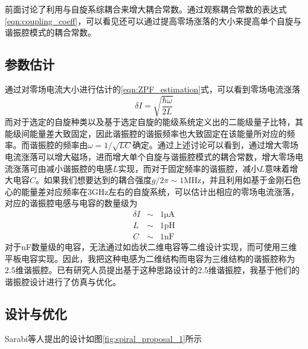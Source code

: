             前面讨论了利用与自旋系综耦合来增大耦合常数。通过观察耦合常数的表达式\ref{eqn:coupling_coeff}，可以看见还可以通过提高零场涨落的大小来提高单个自旋与谐振腔模式的耦合常数。


            \subsection{参数估计} %
            \label{sub:参数估计}

                通过对零场电流大小进行估计的\ref{eqn:ZPF_estimation}式，可以看到零场电流涨落
                \begin{equation}
                    \delta I = \sqrt{ \frac{\hbar \omega}{2 L} }
                \end{equation}
                而对于选定的自旋种类以及基于选定自旋的能级系统定义出的二能级量子比特，其能级间能量差大致固定，因此谐振腔的谐振频率也大致固定在该能量所对应的频率。而谐振腔的频率由$ \omega = 1/\sqrt{LC} $确定。通过上述讨论可以看到，通过增大零场电流涨落可以增大磁场，进而增大单个自旋与谐振腔模式的耦合常数，增大零场电流涨落可由减小谐振腔的电感$L$实现，而对于固定频率的谐振腔，减小$L$意味着增大电容$C$。如果我们想要达到的耦合强度$ g/2 \pi \sim 1 \mathrm{MHz} $，并且利用如基于金刚石色心的能量差对应频率在$3 \mathrm{GHz} $左右的自旋系统，可以估计出相应的零场电流涨落，对应的谐振腔电感与电容的数量级为
                \begin{eqnarray}
                    \delta I & \sim & 1 \mathrm{\mu A}\\
                    L & \sim & 1 \mathrm{pH}\\
                    C & \sim & 1 \mathrm{nF}
                \end{eqnarray}
                对于nF数量级的电容，无法通过如齿状二维电容等二维设计实现，而可使用三维平板电容实现。因此，我把这种电感为二维结构而电容为三维结构的谐振腔称为2.5维谐振腔。已有研究人员提出基于这种思路设计的2.5维谐振腔\cite{sarabi2017prospective}，我基于他们的谐振腔设计进行了仿真与优化。
                

                
            \subsection{设计与优化} %
            \label{sub:设计与优化}

                Sarabi等人提出的设计如图\ref{fig:spiral_proposal_1}所示


